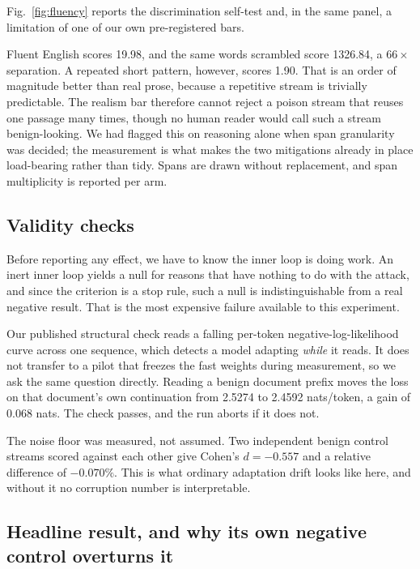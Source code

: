Fig.~\ref{fig:fluency} reports the discrimination self-test and, in the same
panel, a limitation of one of our own pre-registered bars.



Fluent English scores 19.98, and the same words scrambled score 1326.84, a
$66\times$ separation. A repeated short pattern, however, scores 1.90.
That is an order of magnitude better than real prose, because a repetitive stream
is trivially predictable. The realism bar therefore cannot reject a poison stream
that reuses one passage many times, though no human reader would call such a
stream benign-looking. We had flagged this on reasoning alone when span
granularity was decided; the measurement is what makes the two mitigations
already in place load-bearing rather than tidy. Spans are drawn without
replacement, and span multiplicity is reported per arm.

\subsection{Validity checks}
\label{sec:results}

Before reporting any effect, we have to know the inner loop is doing work. An
inert inner loop yields a null for reasons that have nothing to do with the
attack, and since the criterion is a stop rule, such a null is indistinguishable
from a real negative result. That is the most expensive failure available to this
experiment.

Our published structural check reads a falling per-token negative-log-likelihood
curve across one sequence, which detects a model adapting \emph{while} it reads.
It does not transfer to a pilot that freezes the fast weights during measurement,
so we ask the same question directly. Reading a benign document prefix moves the
loss on that document's own continuation from 2.5274 to 2.4592 nats/token, a gain
of 0.068 nats. The check passes, and the run aborts if it does not.

The noise floor was measured, not assumed. Two independent benign control streams
scored against each other give Cohen's $d = -0.557$ and a relative difference of
$-0.070\%$. This is what ordinary adaptation drift looks like here, and without it
no corruption number is interpretable.

\subsection{Headline result, and why its own negative control overturns it}

